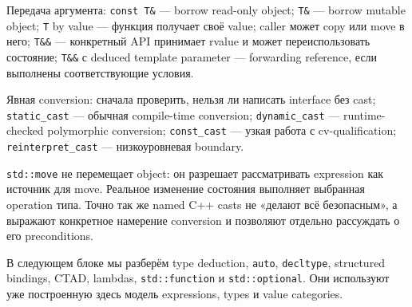 Передача аргумента:
\texttt{const T\&} --- borrow read-only object; \texttt{T\&} --- borrow mutable object; \texttt{T} by value --- функция получает своё value; caller может copy или move в него; \texttt{T\&\&} --- конкретный API принимает rvalue и может переиспользовать состояние; \texttt{T\&\&} с deduced template parameter --- forwarding reference, если выполнены соответствующие условия.

Явная conversion:
сначала проверить, нельзя ли написать interface без cast; \texttt{static\_cast} --- обычная compile-time conversion; \texttt{dynamic\_cast} --- runtime-checked polymorphic conversion; \texttt{const\_cast} --- узкая работа с cv-qualification; \texttt{reinterpret\_cast} --- низкоуровневая boundary.

\begin{importantbox}
\texttt{std::move} не перемещает object: он разрешает рассматривать expression
как источник для move. Реальное изменение состояния выполняет выбранная
operation типа. Точно так же named C++ casts не «делают всё безопасным», а
выражают конкретное намерение conversion и позволяют отдельно рассуждать о его
preconditions.
\end{importantbox}

В следующем блоке мы разберём type deduction, \texttt{auto}, \texttt{decltype},
structured bindings, CTAD, lambdas, \texttt{std::function} и
\texttt{std::optional}. Они используют уже построенную здесь модель expressions,
types и value categories.
